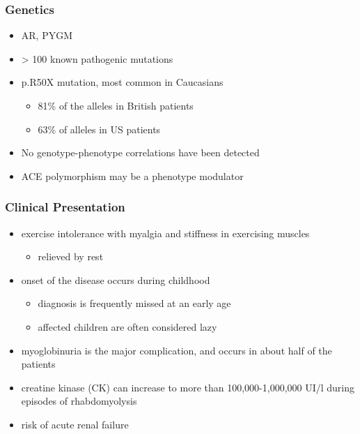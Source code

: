 \documentclass{scrartcl}
\begin{document}
\subsubsection{Genetics}
\label{sec:org0b55c63}
\begin{itemize}
\item AR, PYGM
\item \textgreater{} 100 known pathogenic mutations
\item p.R50X mutation, most common in Caucasians
\begin{itemize}
\item 81\% of the alleles in British patients
\item 63\% of alleles in US patients
\end{itemize}
\item No genotype-phenotype correlations have been detected
\item ACE polymorphism may be a phenotype modulator
\end{itemize}

\subsubsection{Clinical Presentation}
\label{sec:orgb0fb147}
\begin{itemize}
\item exercise intolerance with myalgia and stiffness in exercising muscles
\begin{itemize}
\item relieved by rest
\end{itemize}
\item onset of the disease occurs during childhood
\begin{itemize}
\item diagnosis is frequently missed at an early age
\item affected children are often considered lazy
\end{itemize}
\item myoglobinuria is the major complication, and occurs in about half of
the patients
\item creatine kinase (CK) can increase to more than 100,000-1,000,000
UI/l during episodes of rhabdomyolysis
\item risk of acute renal failure
\end{itemize}
\end{document}
